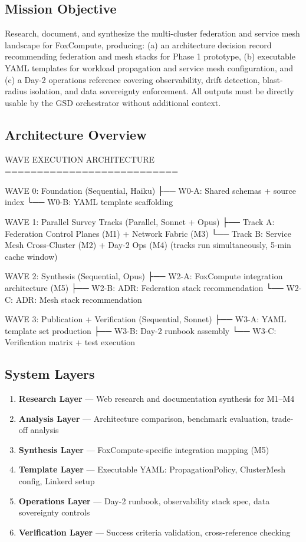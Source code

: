 \documentclass[11pt,letterpaper]{article}
\begin{document}
\subsection{Mission Objective}

Research, document, and synthesize the multi-cluster federation and service mesh landscape for FoxCompute, producing: (a) an architecture decision record recommending federation and mesh stacks for Phase 1 prototype, (b) executable YAML templates for workload propagation and service mesh configuration, and (c) a Day-2 operations reference covering observability, drift detection, blast-radius isolation, and data sovereignty enforcement. All outputs must be directly usable by the GSD orchestrator without additional context.

\subsection{Architecture Overview}

\begin{asciibox}
  WAVE EXECUTION ARCHITECTURE
  ===========================

  WAVE 0: Foundation (Sequential, Haiku)
  ├── W0-A: Shared schemas + source index
  └── W0-B: YAML template scaffolding

  WAVE 1: Parallel Survey Tracks (Parallel, Sonnet + Opus)
  ├── Track A: Federation Control Planes (M1) + Network Fabric (M3)
  └── Track B: Service Mesh Cross-Cluster (M2) + Day-2 Ops (M4)
      (tracks run simultaneously, 5-min cache window)

  WAVE 2: Synthesis (Sequential, Opus)
  ├── W2-A: FoxCompute integration architecture (M5)
  ├── W2-B: ADR: Federation stack recommendation
  └── W2-C: ADR: Mesh stack recommendation

  WAVE 3: Publication + Verification (Sequential, Sonnet)
  ├── W3-A: YAML template set production
  ├── W3-B: Day-2 runbook assembly
  └── W3-C: Verification matrix + test execution
\end{asciibox}

\subsection{System Layers}

\begin{enumerate}
  \item \textbf{Research Layer} --- Web research and documentation synthesis for M1--M4
  \item \textbf{Analysis Layer} --- Architecture comparison, benchmark evaluation, trade-off analysis
  \item \textbf{Synthesis Layer} --- FoxCompute-specific integration mapping (M5)
  \item \textbf{Template Layer} --- Executable YAML: PropagationPolicy, ClusterMesh config, Linkerd setup
  \item \textbf{Operations Layer} --- Day-2 runbook, observability stack spec, data sovereignty controls
  \item \textbf{Verification Layer} --- Success criteria validation, cross-reference checking
\end{enumerate}
\end{document}
